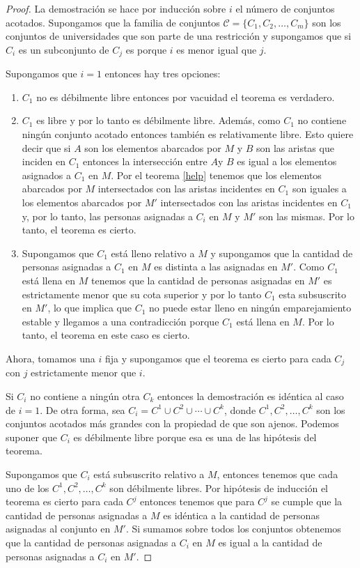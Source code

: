 \begin{proof}
La demostración se hace por inducción sobre $i$ el número de conjuntos acotados. Supongamos que la familia de conjuntos $\mathcal{C}=\{C_1,C_2,\dots,C_m\}$ son los conjuntos de universidades que son parte de una restricción y supongamos que si $C_i$ es un subconjunto de $C_j$ es porque $i$ es menor igual que $j$. 

Supongamos que $i=1$ entonces hay tres opciones:
\begin{enumerate}
\item $C_1$ no es débilmente libre entonces por vacuidad el teorema es verdadero.
\item $C_1$ es libre y por lo tanto es débilmente libre. Además, como $C_1$ no contiene ningún conjunto acotado entonces también es relativamente libre. Esto quiere decir que si $A$ son los elementos abarcados por $M$ y $B$ son las aristas que inciden en $C_1$ entonces la intersección entre $A$y $B$ es igual a los elementos asignados a $C_1$ en $M$. Por el teorema \ref{help} tenemos que los elementos abarcados por $M$ intersectados con las aristas incidentes en $C_1$ son iguales a los elementos abarcados por $M'$ intersectados con las aristas incidentes en $C_1$ y, por lo tanto, las personas asignadas a $C_i$ en $M$ y $M'$ son las mismas. Por lo tanto, el teorema es cierto. 
\item Supongamos que $C_1$ está lleno relativo a $M$ y supongamos que la cantidad de personas asignadas a $C_1$ en $M$ es distinta a las asignadas en $M'$. Como $C_1$ está llena en $M$ tenemos que la cantidad de personas asignadas en $M'$ es estrictamente menor que su cota superior y por lo tanto $C_1$ esta subsuscrito en $M'$, lo que implica que $C_1$ no puede estar lleno en ningún emparejamiento estable y llegamos a una contradicción porque $C_1$ está llena en $M$. Por lo tanto, el teorema en este caso es cierto. 
\end{enumerate}
Ahora, tomamos una $i$ fija y supongamos que el teorema es cierto para cada $C_j$ con $j$ estrictamente menor que $i$. 

Si $C_i$ no contiene a ningún otra $C_k$ entonces la demostración es idéntica al caso de $i=1$. De otra forma, sea $C_i = C^1 \cup C^2 \cup \cdots \cup C^k$, donde $C^1,C^2,\dots,C^k$ son los conjuntos acotados más grandes con la propiedad de que son ajenos. Podemos suponer que $C_i$ es débilmente libre porque esa es una de las hipótesis del teorema. 

Supongamos que $C_i$ está subsuscrito relativo a $M$, entonces tenemos que cada uno de los $C^1,C^2,\dots,C^k$ son débilmente libres. Por hipótesis de inducción el teorema es cierto para cada $C^j$ entonces tenemos que para $C^j$ se cumple que la cantidad de personas asignadas a $M$ es idéntica a la cantidad de personas asignadas al conjunto en $M'$. Si sumamos sobre todos los conjuntos obtenemos que la cantidad de personas asignadas a $C_i$ en $M$ es igual a la cantidad de personas asignadas a $C_i$ en $M'$. 


\end{proof}
